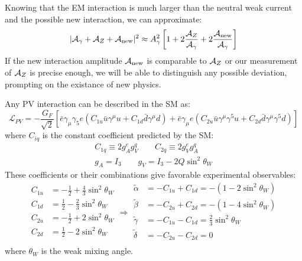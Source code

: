 Knowing that the EM interaction is much larger than the neutral weak current and
the possible new interaction, we can approximate:
\begin{equation}
    |\mathcal{A}_\gamma + \mathcal{A}_Z + \mathcal{A}_{\text{new}}|^2 \approx A^2_\gamma\left[ 1 + 2\frac{\mathcal{A}_Z}{\mathcal{A}_\gamma}
    + 2\frac{\mathcal{A}_{\text{new}}}{\mathcal{A}_\gamma} \right]
\end{equation}
If the new interaction amplitude $\mathcal{A}_{\text{new}}$ is comparable to $\mathcal{A}_Z$ or our measurement 
of $\mathcal{A}_Z$ is precise enough, we will be able to distinguish any possible deviation,
prompting on the existance of new physics.

Any PV interaction can be described in the SM as:
\begin{equation}
    \mathcal{L}_{PV}  = -\frac{G_F}{\sqrt{2}}\left[ 
	\bar{e}\gamma_\mu\gamma_5 e (C_{1u}\bar{u}\gamma^\mu u + C_{1d}\bar{d}\gamma^\mu d)
      + \bar{e}\gamma_\mu e (C_{2u}\bar{u}\gamma^\mu\gamma^5 u + C_{2d}\bar{d}\gamma^\mu \gamma^5d)
	\right]
\end{equation}
where $C_{iq}$ is the constant coefficient predicted by the SM:
\begin{equation}
    \begin{gathered}
	C_{1q} \equiv 2g_A^e g_V^q	\qquad C_{2q} \equiv 2g_V^e g_A^q   \\
	g_A = I_3   \qquad g_V = I_3 - 2Q\sin^2\theta_W
    \end{gathered}
\end{equation}
These coefficients or their combinations give favorable experimental observables:
\begin{equation}
    \begin{aligned}
	C_{1u} &= -\frac{1}{2} + \frac{4}{3}\sin^2\theta_W   \\
	C_{1d} &= \frac{1}{2} - \frac{2}{3}\sin^2\theta_W   \\
	C_{2u} &= -\frac{1}{2} + 2\sin^2\theta_W   \\
	C_{2d} &= \frac{1}{2} - 2\sin^2\theta_W   \\
    \end{aligned}
    \Longrightarrow
    \begin{aligned}
	\tilde{\alpha} &= -C_{1u} + C_{1d} = -(1-2\sin^2\theta_W)	\\
	\tilde{\beta} &= -C_{2u} + C_{2d} = -(1-4\sin^2\theta_W)	\\
	\tilde{\gamma} &= -C_{1u} - C_{1d} = \frac{2}{3}\sin^2\theta_W	\\
	\tilde{\delta} &= -C_{2u} - C_{2d} = 0	\\
    \end{aligned}
\end{equation}
where $\theta_W$ is the weak mixing angle.

